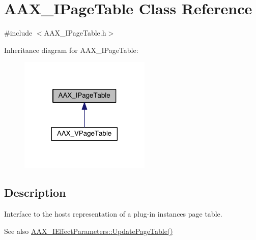 \hypertarget{a00107}{}\section{A\+A\+X\+\_\+\+I\+Page\+Table Class Reference}
\label{a00107}


{\ttfamily \#include $<$A\+A\+X\+\_\+\+I\+Page\+Table.\+h$>$}



Inheritance diagram for A\+A\+X\+\_\+\+I\+Page\+Table\+:
\nopagebreak
\begin{figure}[H]
\begin{center}
\leavevmode
\includegraphics[width=177pt]{a00646}
\end{center}
\end{figure}


\subsection{Description}
Interface to the host\textquotesingle{}s representation of a plug-\/in instance\textquotesingle{}s page table. 

\begin{DoxySeeAlso}{See also}
\hyperlink{a00064_a4cdb043ffbdca6f6c4a7e9a96a4347a2}{A\+A\+X\+\_\+\+I\+Effect\+Parameters\+::\+Update\+Page\+Table()} 
\end{DoxySeeAlso}
